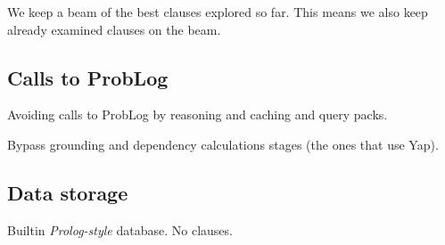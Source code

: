 \documentclass{article}
\begin{document}
We keep a beam of the best clauses explored so far.
This means we also keep already examined clauses on the beam.


\subsection{Calls to ProbLog}

Avoiding calls to ProbLog by reasoning and caching and query packs.

Bypass grounding and dependency calculations stages (the ones that use Yap).

\subsection{Data storage}

Builtin \emph{Prolog-style} database.
No clauses. 
\end{document}
